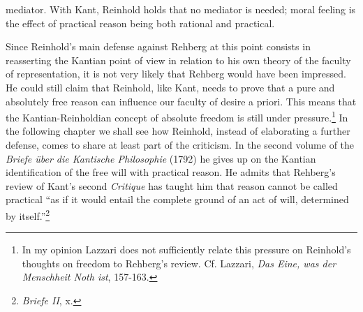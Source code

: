 mediator. With Kant, Reinhold holds that no mediator is needed; moral feeling is the effect of practical reason being both rational and practical.

 Since Reinhold's main defense against Rehberg at this point consists in reasserting the Kantian point of view in relation to his own theory of the faculty of representation, it is not very likely that Rehberg would have been impressed. He could still claim that Reinhold, like Kant, needs to prove that a pure and absolutely free reason can influence our faculty of desire a priori. This means that the Kantian{-}Reinholdian concept of absolute freedom is still under pressure.\footnote{ In my opinion Lazzari does not sufficiently relate this pressure on Reinhold's thoughts on freedom to Rehberg's review. Cf. Lazzari, \textit{Das Eine, was der Menschheit Noth ist}, 157{-}163.} In the following chapter we shall see how Reinhold, instead of elaborating a further defense, comes to share at least part of the criticism. In the second volume of the \textit{Briefe \"{u}ber die Kantische Philosophie} (1792) he gives up on the Kantian identification of the free will with practical reason. He admits that Rehberg's review of Kant's second \textit{Critique }has taught him that reason cannot be called practical ``as if it would entail the complete ground of an act of will, determined by itself.''\footnote{ \textit{Briefe II}, x. } 

